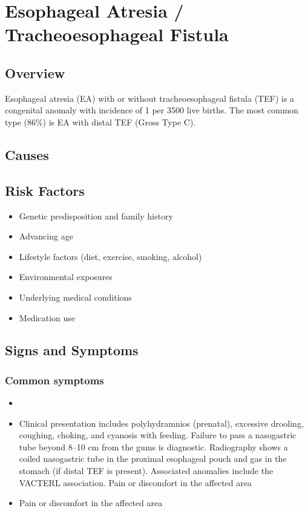 \chapter{Esophageal Atresia / Tracheoesophageal Fistula}
\label{sec:Esophageal Atresia}

\section{Overview}
Esophageal atresia (EA) with or without tracheoesophageal fistula (TEF) is a congenital anomaly with incidence of 1 per 3500 live births. The most common type (86\%) is EA with distal TEF (Gross Type C).
\section{Causes}
\section{Risk Factors}

\begin{itemize}[noitemsep]
  \item Genetic predisposition and family history
  \item Advancing age
  \item Lifestyle factors (diet, exercise, smoking, alcohol)
  \item Environmental exposures
  \item Underlying medical conditions
  \item Medication use
\end{itemize}
\section{Signs and Symptoms}

\subsection{Common symptoms}
\begin{itemize}[noitemsep]
  \item \item Clinical presentation includes polyhydramnios (prenatal), excessive drooling, coughing, choking, and cyanosis with feeding. Failure to pass a nasogastric tube beyond 8--10 cm from the gums is diagnostic. Radiography shows a coiled nasogastric tube in the proximal esophageal pouch and gas in the stomach (if distal TEF is present). Associated anomalies include the VACTERL association. Pain or discomfort in the affected area    \item Pain or discomfort in the affected area
  \end{itemize}

